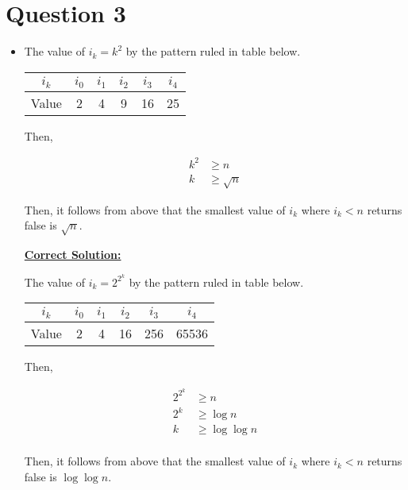 \documentclass[12pt]{article}
\begin{document}
\section*{Question 3}
\begin{itemize}
    \item

    The value of $i_k = k^2$ by the pattern ruled in table below.

    \begin{tabular}{c|c|c|c|c|c}
        $i_k$ & $i_0$ & $i_1$ & $i_2$ & $i_3$ & $i_4$\\
        \hline
        Value & 2 & 4 & 9 & 16 & 25
    \end{tabular}

    \bigskip

    Then,

    \setcounter{equation}{0}
    \begin{align}
        k^2 &\geq n\\
        k &\geq \sqrt{n}
    \end{align}

    Then, it follows from above that the smallest value of $i_k$ where $i_k < n$
    returns false is $\sqrt{n}$.

    \bigskip

    \underline{\textbf{Correct Solution:}}

    The value of $i_k = 2^{2^k}$ by the pattern ruled in table below.

    \begin{tabular}{c|c|c|c|c|c}
        $i_k$ & $i_0$ & $i_1$ & $i_2$ & $i_3$ & $i_4$\\
        \hline
        Value & 2 & 4 & 16 & 256 & 65536
    \end{tabular}


    Then,

    \setcounter{equation}{0}
    \begin{align}
        2^{2^k} &\geq n\\
        2^k &\geq \log n\\
        k &\geq \log \log n\\
    \end{align}

    Then, it follows from above that the smallest value of $i_k$ where $i_k < n$
    returns false is $\log \log n$.

\end{itemize}
\end{document}
